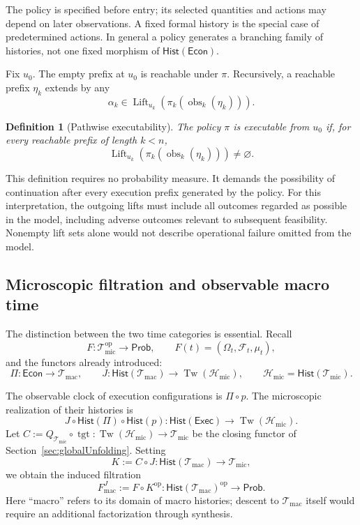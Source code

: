 \documentclass[11pt,a4paper]{article}
\newtheorem{definition}{Definition}[section]
\newcommand{\Econ}{\mathsf{Econ}}
\newcommand{\Prob}{\mathsf{Prob}}
\newcommand{\Hist}{\mathsf{Hist}}
\newcommand{\Tw}{\operatorname{Tw}}
\newcommand{\Tmic}{\mathcal T_{\mathrm{mic}}}
\newcommand{\Tmac}{\mathcal T_{\mathrm{mac}}}
\newcommand{\Hmic}{\mathcal H_{\mathrm{mic}}}
\DeclareMathOperator{\tgt}{tgt}
\begin{document}
The policy is specified before entry; its selected quantities and actions may depend on later observations. 
A fixed formal history is the special case of
predetermined actions. In general a policy generates a branching family
of histories, not one fixed morphism of $\Hist(\Econ)$.

Fix $u_0$. The empty prefix at $u_0$ is reachable under $\pi$.
Recursively, a reachable prefix $\eta_k$ extends by any
\[
    \alpha_k\in\operatorname{Lift}_{u_k}(\pi_k(\operatorname{obs}_k(\eta_k))).
\]

\begin{definition}[Pathwise executability]
The policy $\pi$ is \emph{executable from $u_0$} if, for every reachable
prefix of length $k<n$,
\[
    \operatorname{Lift}_{u_k}(\pi_k(\operatorname{obs}_k(\eta_k)))\neq\varnothing.
\]
\end{definition}

This definition requires no probability measure. It demands the possibility
of continuation after every execution prefix generated by the policy.
For this interpretation, the outgoing lifts must include all outcomes
regarded as possible in the model, including adverse outcomes relevant to
subsequent feasibility. Nonempty lift sets alone would not describe
operational failure omitted from the model.

\subsection{Microscopic filtration and observable macro time}
\label{subsec:execution-filtration}

The distinction between the two time categories is essential. Recall
\[
    F:\Tmic^{\mathrm{op}}\longrightarrow\Prob,
    \qquad F(t)=(\Omega_t,\mathcal F_t,\mu_t),
\]
and the functors already introduced:
\[
    \Pi:\Econ\longrightarrow\Tmac,
    \qquad J:\Hist(\Tmac)\longrightarrow\Tw(\Hmic),
    \qquad \Hmic=\Hist(\Tmic).
\]

The observable clock of execution configurations is $\Pi\circ p$.
The microscopic realization of their histories is
\[
  J\circ\Hist(\Pi)\circ\Hist(p):
  \Hist(\mathsf{Exec})\longrightarrow\Tw(\Hmic).
\]
Let $C := Q_{\Tmic}\circ\tgt:\Tw(\Hmic)\to\Tmic$ be the closing functor
of Section~\ref{sec:globalUnfolding}.
Setting 
\[
K
	:=
C \circ J
	:
\Hist(\Tmac)
	\longrightarrow
\Tmic,
\] 
we obtain the induced filtration
\[
	F_{\mathrm{mac}}^J:=F\circ K^{\mathrm{op}}:
          \Hist(\Tmac)^{\mathrm{op}}\longrightarrow\Prob.
\]
Here ``macro'' refers to its domain of macro histories; descent to
$\Tmac$ itself would require an additional factorization through synthesis.
\end{document}
